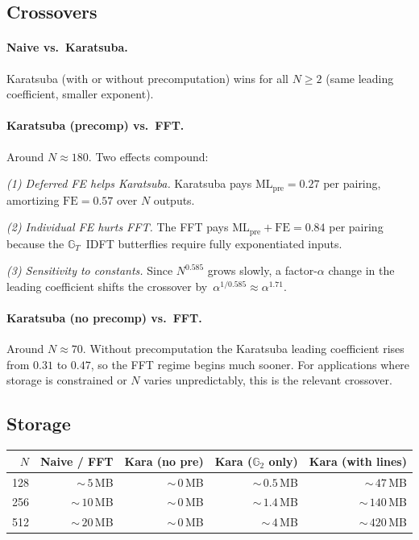 \documentclass[11pt]{article}
\newcommand{\Gt}{\mathbb{G}_T}
\newcommand{\Gtwo}{\mathbb{G}_2}
\newcommand{\MLpre}{\mathrm{ML_{pre}}}
\newcommand{\FE}{\mathrm{FE}}
\theoremstyle{plain}
\theoremstyle{remark}
\begin{document}
\subsection{Crossovers}

\paragraph{Naive vs.\ Karatsuba.}
Karatsuba (with or without precomputation) wins for all $N \ge 2$
(same leading coefficient, smaller exponent).

\paragraph{Karatsuba (precomp) vs.\ FFT.}
Around $N \approx 180$.
Two effects compound:

\emph{(1) Deferred FE helps Karatsuba.}
Karatsuba pays $\MLpre = 0.27$ per pairing,
amortizing $\FE = 0.57$ over $N$ outputs.

\emph{(2) Individual FE hurts FFT.}
The FFT pays $\MLpre + \FE = 0.84$ per pairing
because the $\Gt$~IDFT butterflies
require fully exponentiated inputs.

\emph{(3) Sensitivity to constants.}
Since $N^{0.585}$ grows slowly,
a factor-$\alpha$ change in the leading coefficient
shifts the crossover by~$\alpha^{1/0.585} \approx \alpha^{1.71}$.

\paragraph{Karatsuba (no precomp) vs.\ FFT.}
Around $N \approx 70$.
Without precomputation the Karatsuba leading coefficient
rises from $0.31$ to $0.47$,
so the FFT regime begins much sooner.
For applications where storage is constrained
or $N$ varies unpredictably,
this is the relevant crossover.

\subsection{Storage}

\begin{center}
\begin{tabular}{rrrrr}
\toprule
$N$ & Naive / FFT & Kara (no pre) & Kara ($\Gtwo$ only) & Kara (with lines) \\
\midrule
128 & ${\sim}\,5$\,MB & ${\sim}\,0$\,MB & ${\sim}\,0.5$\,MB & ${\sim}\,47$\,MB \\
256 & ${\sim}\,10$\,MB & ${\sim}\,0$\,MB & ${\sim}\,1.4$\,MB & ${\sim}\,140$\,MB \\
512 & ${\sim}\,20$\,MB & ${\sim}\,0$\,MB & ${\sim}\,4$\,MB & ${\sim}\,420$\,MB \\
\bottomrule
\end{tabular}
\end{center}
\end{document}
